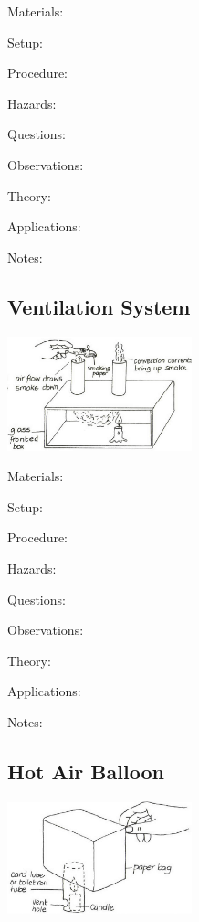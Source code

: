 \begin{multicols}{2}
\begin{description*}
\item[Materials:]{}
\item[Setup:]{}
\item[Procedure:]{}
\item[Hazards:]{}
\item[Questions:]{}
\item[Observations:]{}
\item[Theory:]{}
\item[Applications:]{}
\item[Notes:]{}
\end{description*}

\subsection{Ventilation System}

\begin{center}
\includegraphics[width=0.4\textwidth]{./img/vso/ventilation-system.png}
\end{center}

\begin{description*}
\item[Materials:]{}
\item[Setup:]{}
\item[Procedure:]{}
\item[Hazards:]{}
\item[Questions:]{}
\item[Observations:]{}
\item[Theory:]{}
\item[Applications:]{}
\item[Notes:]{}
\end{description*}

\subsection{Hot Air Balloon}

\begin{center}
\includegraphics[width=0.4\textwidth]{./img/vso/hot-air-balloon.png}
\end{center}


\end{multicols}
